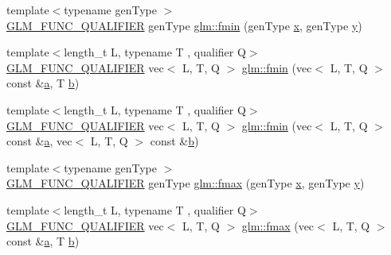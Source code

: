\begin{DoxyCompactItemize}
\item 
{\footnotesize template$<$typename gen\+Type $>$ }\\\hyperlink{setup_8hpp_a33fdea6f91c5f834105f7415e2a64407}{G\+L\+M\+\_\+\+F\+U\+N\+C\+\_\+\+Q\+U\+A\+L\+I\+F\+I\+ER} gen\+Type \hyperlink{group__gtx__extended__min__max_gaa3200559611ac5b9b9ae7283547916a7}{glm\+::fmin} (gen\+Type \hyperlink{_s_d_l__opengl_8h_ad0e63d0edcdbd3d79554076bf309fd47}{x}, gen\+Type \hyperlink{_s_d_l__opengl_8h_a1675d9d7bb68e1657ff028643b4037e3}{y})
\item 
{\footnotesize template$<$length\+\_\+t L, typename T , qualifier Q$>$ }\\\hyperlink{setup_8hpp_a33fdea6f91c5f834105f7415e2a64407}{G\+L\+M\+\_\+\+F\+U\+N\+C\+\_\+\+Q\+U\+A\+L\+I\+F\+I\+ER} vec$<$ L, T, Q $>$ \hyperlink{group__gtx__extended__min__max_gae989203363cff9eab5093630df4fe071}{glm\+::fmin} (vec$<$ L, T, Q $>$ const \&\hyperlink{_s_d_l__opengl__glext_8h_a3309789fc188587d666cda5ece79cf82}{a}, T \hyperlink{_s_d_l__opengl__glext_8h_a0f71581a41fd2264c8944126dabbd010}{b})
\item 
{\footnotesize template$<$length\+\_\+t L, typename T , qualifier Q$>$ }\\\hyperlink{setup_8hpp_a33fdea6f91c5f834105f7415e2a64407}{G\+L\+M\+\_\+\+F\+U\+N\+C\+\_\+\+Q\+U\+A\+L\+I\+F\+I\+ER} vec$<$ L, T, Q $>$ \hyperlink{group__gtx__extended__min__max_ga7c42e93cd778c9181d1cdeea4d3e43bd}{glm\+::fmin} (vec$<$ L, T, Q $>$ const \&\hyperlink{_s_d_l__opengl__glext_8h_a3309789fc188587d666cda5ece79cf82}{a}, vec$<$ L, T, Q $>$ const \&\hyperlink{_s_d_l__opengl__glext_8h_a0f71581a41fd2264c8944126dabbd010}{b})
\item 
{\footnotesize template$<$typename gen\+Type $>$ }\\\hyperlink{setup_8hpp_a33fdea6f91c5f834105f7415e2a64407}{G\+L\+M\+\_\+\+F\+U\+N\+C\+\_\+\+Q\+U\+A\+L\+I\+F\+I\+ER} gen\+Type \hyperlink{group__gtx__extended__min__max_gae5792cb2b51190057e4aea027eb56f81}{glm\+::fmax} (gen\+Type \hyperlink{_s_d_l__opengl_8h_ad0e63d0edcdbd3d79554076bf309fd47}{x}, gen\+Type \hyperlink{_s_d_l__opengl_8h_a1675d9d7bb68e1657ff028643b4037e3}{y})
\item 
{\footnotesize template$<$length\+\_\+t L, typename T , qualifier Q$>$ }\\\hyperlink{setup_8hpp_a33fdea6f91c5f834105f7415e2a64407}{G\+L\+M\+\_\+\+F\+U\+N\+C\+\_\+\+Q\+U\+A\+L\+I\+F\+I\+ER} vec$<$ L, T, Q $>$ \hyperlink{group__gtx__extended__min__max_gab380df808a15a6a23993e3475d1b94d2}{glm\+::fmax} (vec$<$ L, T, Q $>$ const \&\hyperlink{_s_d_l__opengl__glext_8h_a3309789fc188587d666cda5ece79cf82}{a}, T \hyperlink{_s_d_l__opengl__glext_8h_a0f71581a41fd2264c8944126dabbd010}{b})

\end{DoxyCompactItemize}
